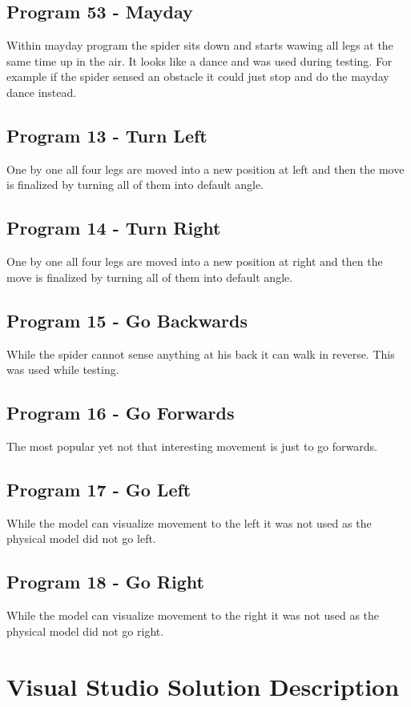 \documentclass[12pt,leqno]{book}
\begin{document}
\subsection{Program 53 - Mayday}
Within mayday program the spider sits down and starts wawing all legs at the same time up in the air. It looks like a dance and was used during testing. For example if the spider sensed an obstacle it could just stop and do the mayday dance instead.
\subsection{Program 13 - Turn Left}
One by one all four legs are moved into a new position at left and then the move is finalized by turning all of them into default angle.
\subsection{Program 14 - Turn Right}
One by one all four legs are moved into a new position at right and then the move is finalized by turning all of them into default angle.
\subsection{Program 15 - Go Backwards}
While the spider cannot sense anything at his back it can walk in reverse. This was used while testing.
\subsection{Program 16 - Go Forwards}
The most popular yet not that interesting movement is just to go forwards.
\subsection{Program 17 - Go Left}
While the model can visualize movement to the left it was not used as the physical model did not go left.
\subsection{Program 18 - Go Right}
While the model can visualize movement to the right it was not used as the physical model did not go right.



\section{Visual Studio Solution Description}
\end{document}
